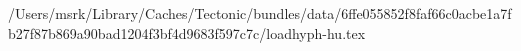/Users/msrk/Library/Caches/Tectonic/bundles/data/6ffe055852f8faf66c0acbe1a7fb27f87b869a90bad1204f3bf4d9683f597c7c/loadhyph-hu.tex